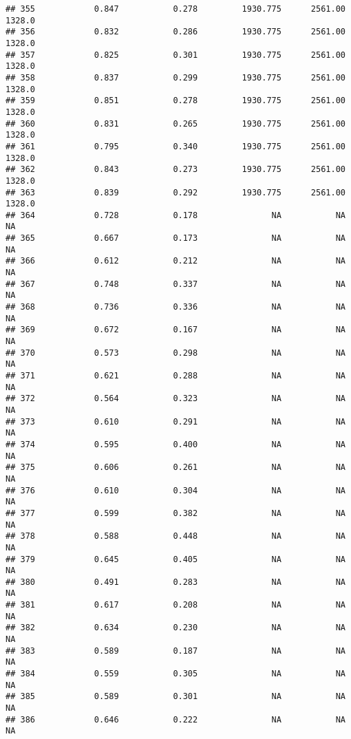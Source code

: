 \documentclass[
]{article}
\begin{document}
\begin{verbatim}
## 355            0.847           0.278         1930.775      2561.00       1328.0
## 356            0.832           0.286         1930.775      2561.00       1328.0
## 357            0.825           0.301         1930.775      2561.00       1328.0
## 358            0.837           0.299         1930.775      2561.00       1328.0
## 359            0.851           0.278         1930.775      2561.00       1328.0
## 360            0.831           0.265         1930.775      2561.00       1328.0
## 361            0.795           0.340         1930.775      2561.00       1328.0
## 362            0.843           0.273         1930.775      2561.00       1328.0
## 363            0.839           0.292         1930.775      2561.00       1328.0
## 364            0.728           0.178               NA           NA           NA
## 365            0.667           0.173               NA           NA           NA
## 366            0.612           0.212               NA           NA           NA
## 367            0.748           0.337               NA           NA           NA
## 368            0.736           0.336               NA           NA           NA
## 369            0.672           0.167               NA           NA           NA
## 370            0.573           0.298               NA           NA           NA
## 371            0.621           0.288               NA           NA           NA
## 372            0.564           0.323               NA           NA           NA
## 373            0.610           0.291               NA           NA           NA
## 374            0.595           0.400               NA           NA           NA
## 375            0.606           0.261               NA           NA           NA
## 376            0.610           0.304               NA           NA           NA
## 377            0.599           0.382               NA           NA           NA
## 378            0.588           0.448               NA           NA           NA
## 379            0.645           0.405               NA           NA           NA
## 380            0.491           0.283               NA           NA           NA
## 381            0.617           0.208               NA           NA           NA
## 382            0.634           0.230               NA           NA           NA
## 383            0.589           0.187               NA           NA           NA
## 384            0.559           0.305               NA           NA           NA
## 385            0.589           0.301               NA           NA           NA
## 386            0.646           0.222               NA           NA           NA

\end{verbatim}
\end{document}
